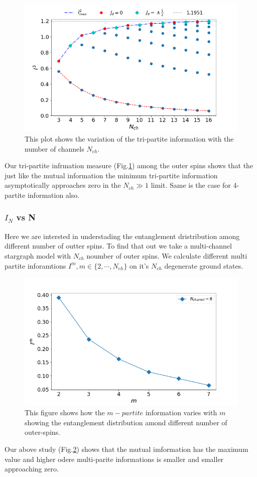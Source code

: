 \documentclass[reprint,prb,superscriptaddress]{revtex4-1}
\begin{document}
\begin{figure}[!h]
\includegraphics[scale=0.32]{plt/I_3_vs_Nch_1_2_3}
\caption{This plot shows the variation of the tri-partite information with the number of channels $N_{ch}$.}
\label{fig:I3_vs_Nch}
\end{figure}
\noindent Our tri-partite infrmation measure (Fig.\ref{fig:I3_vs_Nch}) among the outer spins shows that the just like the mutual information the minimum tri-partite information asymptotically approaches zero in the $N_{ch}\gg 1$ limit. Same is the case for 4-partite information also.

\subsubsection{$I_N$ vs N}
\noindent Here we are intersted in understading the entanglement dristribution among different number of outter spins. To find that out we take a multi-channel stargraph model with $N_{ch}$ noumber of outer spins. We calculate different multi partite inforamtions $I^m, m\in \{2,\cdots,N_{ch}\}$ on it's $N_{ch}$ degenerate ground states. 

\begin{figure}
\includegraphics[scale=0.32]{plt/I_N_vs_N_N9.png}
\caption{This figure shows how the $m-partite$ information varies with $m$ showing the entanglement distribution amond different number of outer-spins.}
\label{fig:Im_vs_m}
\end{figure}
\noindent Our above study (Fig.\ref{fig:Im_vs_m}) shows that the mutual imformation has the maximum value and higher odere multi-parite informations is smaller and smaller approaching zero.
\end{document}
